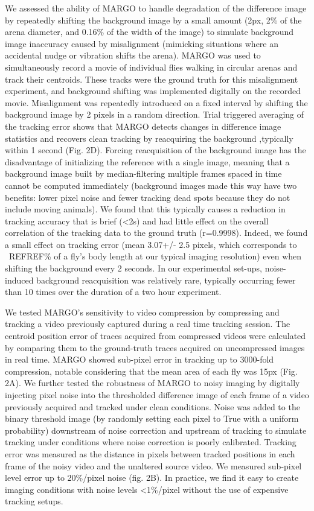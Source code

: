\documentclass[10pt]{article}
\begin{document}
\begin{multicols}{2}
We assessed the ability of MARGO to handle degradation of the difference image by repeatedly shifting the background image by a small amount (2px, 2\% of the arena diameter, and 0.16\% of the width of the image) to simulate background image inaccuracy caused by misalignment (mimicking situations where an accidental nudge or vibration shifts the arena). MARGO was used to simultaneously record a movie of individual flies walking in circular arenas and track their centroids. These tracks were the ground truth for this misalignment experiment, and background shifting was implemented digitally on the recorded movie. Misalignment was repeatedly introduced on a fixed interval by shifting the background image by 2 pixels in a random direction. Trial triggered averaging of the tracking error shows that MARGO detects changes in difference image statistics and recovers clean tracking by reacquiring the background ,typically within 1 second (Fig. 2D). Forcing reacquisition of the background image has the disadvantage of initializing the reference with a single image, meaning that a background image built by median-filtering multiple frames spaced in time cannot be computed immediately (background images made this way have two benefits: lower pixel noise and fewer tracking dead spots because they do not include moving animals). We found that this typically causes a reduction in tracking accuracy that is brief (<2s) and had little effect on the overall correlation of the tracking data to the ground truth (r=0.9998). Indeed, we found a small effect on tracking error (mean 3.07+/- 2.5 pixels, which corresponds to ~REFREF\% of a fly's body length at our typical imaging resolution) even when shifting the background every 2 seconds. In our experimental set-ups, noise-induced background reacquisition was relatively rare, typically occurring fewer than 10 times over the duration of a two hour experiment.

We tested MARGO's sensitivity to video compression by compressing and tracking a video previously captured during a real time tracking session. The centroid position error of traces acquired from compressed videos were calculated by comparing them to the ground-truth traces acquired on uncompressed images in real time. MARGO showed sub-pixel error in tracking up to 3000-fold compression, notable considering that the mean area of each fly was 15px (Fig. 2A). We further tested the robustness of MARGO to noisy imaging by digitally injecting pixel noise into the thresholded difference image of each frame of a video previously acquired and tracked under clean conditions. Noise was added to the binary threshold image (by randomly setting each pixel to True with a uniform probability) downstream of noise correction and upstream of tracking to simulate tracking under conditions where noise correction is poorly calibrated. Tracking error was measured as the distance in pixels between tracked positions in each frame of the noisy video and the unaltered source video.  We measured sub-pixel level error up to 20\%/pixel noise (fig. 2B). In practice, we find it easy to create imaging conditions with noise levels <1\%/pixel without the use of expensive tracking setups.


\end{multicols}
\end{document}
